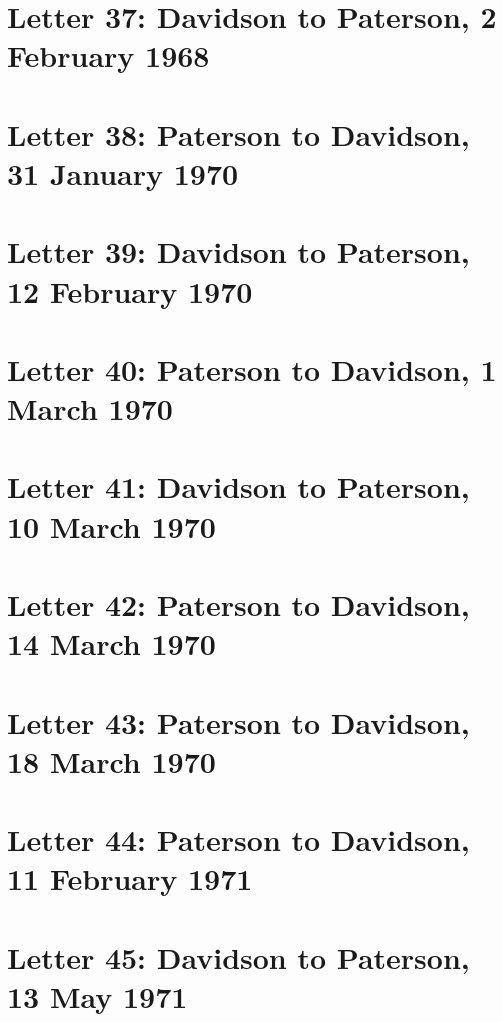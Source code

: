 \documentclass[a4paper,11pt,abstracton,hidelinks]{scrartcl}
\begin{document}
\section{Letter 37: Davidson to Paterson, 2 February 1968}


\section{Letter 38: Paterson to Davidson, 31 January 1970}


\section{Letter 39: Davidson to Paterson, 12 February 1970}


\section{Letter 40: Paterson to Davidson, 1 March 1970}


\section{Letter 41: Davidson to Paterson, 10 March 1970}


\section{Letter 42: Paterson to Davidson, 14 March 1970}


\section{Letter 43: Paterson to Davidson, 18 March 1970}


\section{Letter 44: Paterson to Davidson, 11 February 1971}


\section{Letter 45: Davidson to Paterson, 13 May 1971}



\printbibliography
\end{document}
